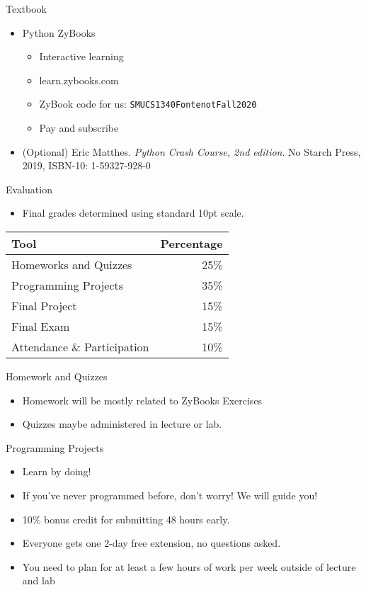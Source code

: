 \begin{frame}[fragile]{Textbook}
\protect\hypertarget{textbook}{}
\begin{itemize}
\tightlist
\item
  Python ZyBooks

  \begin{itemize}
  \tightlist
  \item
    Interactive learning
  \item
    learn.zybooks.com
  \item
    ZyBook code for us: \texttt{SMUCS1340FontenotFall2020}
  \item
    Pay and subscribe
  \end{itemize}
\item
  (Optional) Eric Matthes. \emph{Python Crash Course, 2nd edition}. No
  Starch Press, 2019, ISBN-10: 1-59327-928-0
\end{itemize}
\end{frame}

\begin{frame}{Evaluation}
\protect\hypertarget{evaluation}{}
\begin{itemize}
\tightlist
\item
  Final grades determined using standard 10pt scale.
\end{itemize}

\begin{longtable}[]{@{}lr@{}}
\toprule
Tool & Percentage\tabularnewline
\midrule
\endhead
Homeworks and Quizzes & 25\%\tabularnewline
Programming Projects & 35\%\tabularnewline
Final Project & 15\%\tabularnewline
Final Exam & 15\%\tabularnewline
Attendance \& Participation & 10\%\tabularnewline
\bottomrule
\end{longtable}
\end{frame}

\begin{frame}{Homework and Quizzes}
\protect\hypertarget{homework-and-quizzes}{}
\begin{itemize}
\tightlist
\item
  Homework will be mostly related to ZyBooks Exercises
\item
  Quizzes maybe administered in lecture or lab.
\end{itemize}
\end{frame}

\begin{frame}{Programming Projects}
\protect\hypertarget{programming-projects}{}
\begin{itemize}
\tightlist
\item
  Learn by doing!
\item
  If you've never programmed before, don't worry! We will guide you!
\item
  10\% bonus credit for submitting 48 hours early.
\item
  Everyone gets one 2-day free extension, no questions asked.\\
\item
  You need to plan for at least a few hours of work per week outside of
  lecture and lab
\end{itemize}
\end{frame}

